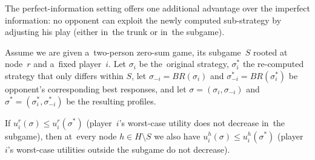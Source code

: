 The perfect-information setting offers one additional advantage over the imperfect information:
no opponent can exploit the newly computed sub-strategy by adjusting his play (either in~the trunk or in~the subgame).
\begin{thm}
  \label{thm:perf-info-subgames-unexploitability}
  Assume we are given a~two-person zero-sum game, its subgame~$S$ rooted at node~$r$ and a~fixed player~$i$.
  Let $\sigma_i$ be the~original strategy, $\sigma_i^*$ the re-computed strategy that only differs within $S$, let $\sigma_{-i} = BR(\sigma _{i})$ and $\sigma_{-i}^* = BR(\sigma^*_{i})$ be opponent's corresponding best responses, and let $\sigma = (\sigma_i, \sigma_{-i})$ and $\sigma^* = (\sigma_i^*, \sigma_{-i}^*)$ be the resulting profiles.

  If $u_i^r (\sigma) \le u_i^r (\sigma^*)$ (player~$i$'s worst-case utility does not decrease in~the subgame), then at~every node $h \in H \setminus S$ we also have $u_i^h (\sigma) \le u_i^h (\sigma^*)$ (player~$i$'s worst-case utilities outside the subgame do not decrease).
\end{thm}
